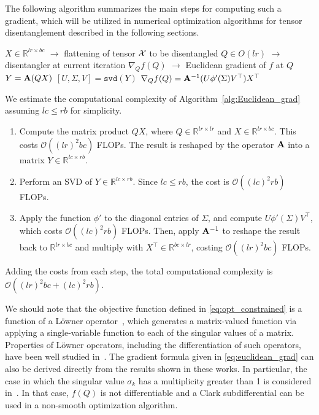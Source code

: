 \documentclass[pdflatex,sn-mathphys-num]{sn-jnl}
\newcounter{thm}[section]
\newcommand{\bfA}[1]{{\textbf A}(#1)}
\begin{document}
\noindent 
The following algorithm summarizes the main steps for computing such a gradient, which will be utilized in numerical optimization algorithms for tensor disentanglement described in the following sections. 
%
\begin{algorithm} \label{alg:Euclidean_grad}
 \caption{Compute Euclidean gradient of disentangle cost function} 
\begin{algorithmic}[1]
\Require 
\Statex $X \in \mathbb{R}^{lr \times bc}$ $\rightarrow$ flattening of tensor ${\cal X}$ to be disentangled
\Statex $Q \in O(lr)$ $\rightarrow$ disentangler at current iteration
%
\Ensure 
$\nabla_Q f(Q)$ $\rightarrow$ Euclidean gradient of $f$ at $Q$
\State $Y = \bfA{QX}$
\State $[U,\Sigma,V] = \texttt{svd}(Y)$ 
\State $\nabla_Q f(Q) = {\bf A}^{-1}(U\phi'(\Sigma)V^{\top})X^{\top}$ 
\end{algorithmic}
\end{algorithm}

\noindent
We estimate the computational complexity of Algorithm~\ref{alg:Euclidean_grad} assuming $lc \leq rb$ for simplicity. 
%
\begin{enumerate}[label={Step \arabic*:}, leftmargin=*]
\item Compute the matrix product $QX$, where $Q \in \mathbb{R}^{lr \times lr}$ and $X \in \mathbb{R}^{lr \times bc}$. This costs $\mathcal{O}((lr)^2 bc)$ FLOPs. The result is reshaped by the operator ${\bf A}$ into a matrix $Y \in \mathbb{R}^{lc \times rb}$.

\item Perform an SVD of $Y \in \mathbb{R}^{lc \times rb}$. Since $lc \leq rb$, the cost is $\mathcal{O}((lc)^2 rb)$ FLOPs.

\item Apply the function $\phi'$ to the diagonal entries of $\Sigma$, and compute $U \phi'(\Sigma) V^\top$, which costs $\mathcal{O}((lc)^2 rb)$ FLOPs. Then, apply ${\bf A}^{-1}$ to reshape the result back to $\mathbb{R}^{lr \times bc}$ and multiply with $X^\top \in \mathbb{R}^{bc \times lr}$, costing $\mathcal{O}((lr)^2 bc)$ FLOPs.
\end{enumerate}
%
Adding the costs from each step, the total computational complexity is
$\mathcal{O}((lr)^2 bc + (lc)^2 rb)$.

We should note that the objective function defined in \eqref{eq:opt_constrained} is a function of a L\"{o}wner operator~\cite{lowner}, which generates a matrix-valued
 function via applying a single-variable function to each of the singular values of a matrix. Properties of L\"{o}wner operators, including the differentiation of such operators, have been well studied in~\cite{dsst:2018,lese:2005a,lese:2005b}. The gradient formula given in \eqref{eq:euclidean_grad} can also be derived directly from the results shown in these works. In particular, the case in which the singular value $\sigma_k$ has a multiplicity greater than 1 is considered in~\cite{lese:2005b}. In that case, $f(Q)$ is not differentiable and a Clark subdifferential can be used in a non-smooth optimization algorithm. 
\end{document}
